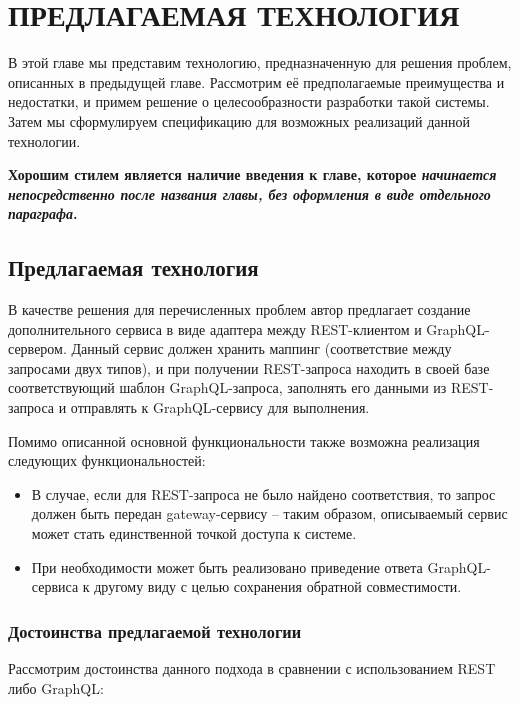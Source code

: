 

\chapter{ПРЕДЛАГАЕМАЯ ТЕХНОЛОГИЯ} \label{ch:ch2}

В этой главе мы представим технологию, предназначенную для решения проблем, описанных в предыдущей главе.
Рассмотрим её предполагаемые преимущества и недостатки, и примем решение о целесообразности разработки такой системы.
Затем мы сформулируем спецификацию для возможных реализаций данной технологии.


\textbf{Хорошим стилем является наличие введения к главе, которое \textit{начинается непосредственно после названия главы, без оформления в виде отдельного параграфа}.}


\section{Предлагаемая технология}\label{sec:proposed-technology}

В качестве решения для перечисленных проблем автор предлагает создание дополнительного сервиса в виде адаптера между REST-клиентом и GraphQL-сервером.
Данный сервис должен хранить маппинг (соответствие между запросами двух типов), и при получении REST-запроса находить в своей базе соответствующий шаблон GraphQL-запроса, заполнять его данными из REST-запроса и отправлять к GraphQL-сервису для выполнения.

Помимо описанной основной функциональности также возможна реализация следующих функциональностей:

\begin{itemize}
    \item В случае, если для REST-запроса не было найдено соответствия, то запрос должен быть передан gateway-сервису – таким образом, описываемый сервис может стать единственной точкой доступа к системе.
    \item При необходимости может быть реализовано приведение ответа GraphQL-сервиса к другому виду с целью сохранения обратной совместимости.
\end{itemize}

\subsection{Достоинства предлагаемой технологии}\label{subsec:proposed-technology-advantages}

Рассмотрим достоинства данного подхода в сравнении с использованием REST либо GraphQL:

